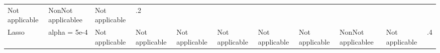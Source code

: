 \documentclass[11pt, a4paper , landscape]{article}
\begin{document}
\begin{longtable}[]{@{}lllllllllll@{}}
\begin{minipage}[t]{0.09\columnwidth}
Not applicable\strut
\end{minipage} & \begin{minipage}[t]{0.09\columnwidth}\raggedright\strut
NonNot applicablee\strut
\end{minipage} & \begin{minipage}[t]{0.10\columnwidth}\raggedright\strut
Not applicable\strut
\end{minipage} & \begin{minipage}[t]{0.04\columnwidth}\raggedright\strut
.2\strut
\end{minipage}\tabularnewline
\begin{minipage}[t]{0.04\columnwidth}\raggedright\strut
Lasso\strut
\end{minipage} & \begin{minipage}[t]{0.09\columnwidth}\raggedright\strut
alpha = 5e-4\strut
\end{minipage} & \begin{minipage}[t]{0.04\columnwidth}\raggedright\strut
Not applicable\strut
\end{minipage} & \begin{minipage}[t]{0.05\columnwidth}\raggedright\strut
Not applicable\strut
\end{minipage} & \begin{minipage}[t]{0.05\columnwidth}\raggedright\strut
Not applicable\strut
\end{minipage} & \begin{minipage}[t]{0.05\columnwidth}\raggedright\strut
Not applicable\strut
\end{minipage} & \begin{minipage}[t]{0.09\columnwidth}\raggedright\strut
Not applicable\strut
\end{minipage} & \begin{minipage}[t]{0.09\columnwidth}\raggedright\strut
Not applicable\strut
\end{minipage} & \begin{minipage}[t]{0.09\columnwidth}\raggedright\strut
NonNot applicablee\strut
\end{minipage} & \begin{minipage}[t]{0.10\columnwidth}\raggedright\strut
Not applicable\strut
\end{minipage} & \begin{minipage}[t]{0.04\columnwidth}\raggedright\strut
.4\strut
\end{minipage}\tabularnewline
\bottomrule
\end{longtable}
\end{document}
